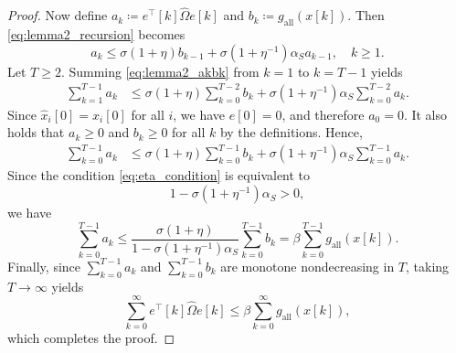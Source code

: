 \documentclass[letterpaper,10pt,conference]{ieeeconf}
\newtheorem{lemma}{Lemma}
\newcommand{\Z}{\mathbb{Z}}
\DeclareMathOperator{\diag}{diag}
\begin{document}
\begin{proof}
  Now define $a_k \coloneqq e^\top[k] \hat{\Omega} e[k]$ and $b_k \coloneqq g_{\mathrm{all}}(x[k])$.
  Then \eqref{eq:lemma2_recursion} becomes
  \begin{equation}
    a_k \leq \sigma(1+\eta)b_{k-1}
    + \sigma\left(1+\eta^{-1}\right)\alpha_S a_{k-1},
    \quad k \geq 1.
    \label{eq:lemma2_akbk}
  \end{equation}
  Let $T \geq 2$.
  Summing \eqref{eq:lemma2_akbk} from $k=1$ to $k=T-1$ yields
  \begin{align}
    \sum_{k=1}^{T-1} a_k
    &\leq \sigma(1+\eta)\sum_{k=0}^{T-2} b_k
    + \sigma\left(1+\eta^{-1}\right)\alpha_S \sum_{k=0}^{T-2} a_k.
  \end{align}
  Since $\hat{x}_i[0]=x_i[0]$ for all $i$, we have $e[0]=0$, and therefore $a_0 = 0$.
  It also holds that $a_k \geq 0$ and $b_k \geq 0$ for all $k$ by the definitions.
  Hence,
  \begin{align}
    \sum_{k=0}^{T-1} a_k
    &\leq \sigma(1+\eta)\sum_{k=0}^{T-1} b_k
    + \sigma\left(1+\eta^{-1}\right)\alpha_S \sum_{k=0}^{T-1} a_k.
  \end{align}
  Since the condition \eqref{eq:eta_condition} is equivalent to
  \begin{equation}
    1 - \sigma \left( 1 + \eta^{-1} \right) \alpha_S >0,
    \label{eq:lemma2_gain_condition}
  \end{equation}
  we have
  \begin{equation} \label{eq:lemma2_inequality_finite}
    \sum_{k=0}^{T-1} a_k
    \leq
    \frac{\sigma(1+\eta)}
    {1-\sigma\left(1+\eta^{-1}\right)\alpha_S}
    \sum_{k=0}^{T-1} b_k
    =
    \beta \sum_{k=0}^{T-1} g_{\mathrm{all}}(x[k]).
  \end{equation}
  Finally, since $\sum_{k=0}^{T-1} a_k$ and $\sum_{k=0}^{T-1} b_k$ are monotone nondecreasing in $T$, taking $T \to \infty$ yields
  \begin{equation}
    \sum_{k=0}^{\infty} e^\top[k] \hat{\Omega} e[k]
    \leq
    \beta \sum_{k=0}^{\infty} g_{\mathrm{all}}(x[k]),
  \end{equation}
  which completes the proof.
\end{proof}

\end{document}
